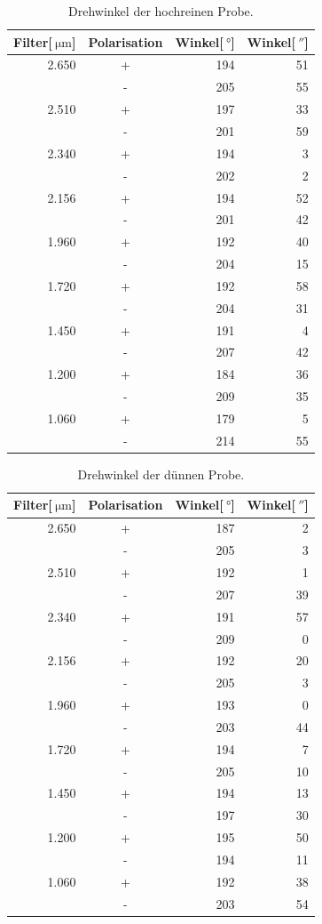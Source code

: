 \begin{table}
	\centering
	\caption[]{Drehwinkel der hochreinen Probe.}
	\begin{tabular}{r c r r }
		Filter[$\SI{}{\micro\meter}$] & Polarisation & Winkel[$\SI{}{\degree}$] & Winkel[$\SI{}{\arcsecond}$]\\
		\hline\hline
		2.650	&	+	&	194	&	51\\
				&	-	&	205	&	55\\
		2.510	&	+	&	197	&	33\\
				&	-	&	201	&	59\\
		2.340	&	+	&	194	&	 3\\
				&	-	&	202	&	 2\\
		2.156	&	+	&	194	&	52\\
				&	-	&	201	&	42\\
		1.960	&	+	&	192	&	40\\
				&	-	&	204	&	15\\
		1.720	&	+	&	192	&	58\\
				&	-	&	204	&	31\\
		1.450	&	+	&	191	&	 4\\
				&	-	&	207	&	42\\
		1.200	&	+	&	184	&	36\\
				&	-	&	209	&	35\\
		1.060	&	+	&	179	&	 5\\
				&	-	&	214	&	55\\
		\hline
	\end{tabular}
	\label{tab_1}
\end{table}

\begin{table}
	\centering
	\caption[]{Drehwinkel der dünnen Probe.}
	\begin{tabular}{r c r r }
		Filter[$\SI{}{\micro\meter}$] & Polarisation & Winkel[$\SI{}{\degree}$] & Winkel[$\SI{}{\arcsecond}$]\\
		\hline\hline
		2.650	&	+	&	187	&	 2\\
				&	-	&	205	&	 3\\
		2.510	&	+	&	192	&	 1\\
				&	-	&	207	&	39\\
		2.340	&	+	&	191	&	57\\
				&	-	&	209	&	 0\\
		2.156	&	+	&	192	&	20\\
				&	-	&	205	&	 3\\
		1.960	&	+	&	193	&	 0\\
				&	-	&	203	&	44\\
		1.720	&	+	&	194	&	 7\\
				&	-	&	205	&	10\\
		1.450	&	+	&	194	&	13\\
				&	-	&	197	&	30\\
		1.200	&	+	&	195	&	50\\
				&	-	&	194	&	11\\
		1.060	&	+	&	192	&	38\\
				&	-	&	203	&	54\\
		\hline
	\end{tabular}
	\label{tab_2}
\end{table}

